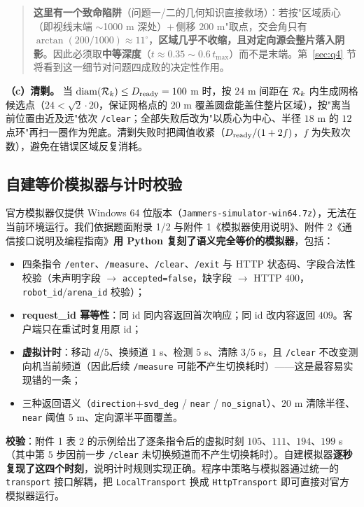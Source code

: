 \begin{quote}
\textbf{这里有一个致命陷阱}（问题一/二的几何知识直接救场）：若按"区域质心（即视线末端 $\sim$1000 m 深处）$+\,$侧移 $200$ m"取点，交会角只有 $\arctan(200/1000)\approx11^\circ$，\textbf{区域几乎不收缩，且对定向源会整片落入阴影}。因此必须取\textbf{中等深度}（$t\approx0.35\!\sim\!0.6\,t_{\max}$）而不是末端。第~\ref{sec:q4} 节将看到这一细节对问题四成败的决定性作用。
\end{quote}

\noindent\textbf{（c）清剿。} 当 $\operatorname{diam}(\mathcal{R}_k)\le D_{\rm ready}=100$ m 时，按 $24$ m 间距在 $\mathcal{R}_k$ 内生成网格候选点（$24<\sqrt2\cdot20$，保证网格点的 $20$ m 覆盖圆盘能盖住整片区域），按"离当前位置由近及远"依次 \texttt{/clear}；全部失败后改为"以质心为中心、半径 $18$ m 的 $12$ 点环"再扫一圈作为兜底。清剿失败时把阈值收紧（$D_{\rm ready}/(1+2f)$，$f$ 为失败次数），避免在错误区域反复消耗。

\subsection{自建等价模拟器与计时校验}

官方模拟器仅提供 Windows 64 位版本（\texttt{Jammers-simulator-win64.7z}），无法在当前环境运行。我们依据题面附录 1/2 与附件 1《模拟器使用说明》、附件 2《通信接口说明及编程指南》\textbf{用 Python 复刻了语义完全等价的模拟器}，包括：

\begin{itemize}
  \item 四条指令 \texttt{/enter}、\texttt{/measure}、\texttt{/clear}、\texttt{/exit} 与 HTTP 状态码、字段合法性校验（未声明字段 $\to$ \texttt{accepted=false}，缺字段 $\to$ HTTP $400$，\texttt{robot\_id}/\texttt{arena\_id} 校验）；
  \item \textbf{request\_id 幂等性}：同 id 同内容返回首次响应；同 id 改内容返回 $409$。客户端只在重试时复用原 id；
  \item \textbf{虚拟计时}：移动 $d/5$、换频道 $1$ s、检测 $5$ s、清除 $3/5$ s，且 \texttt{/clear} 不改变测向机当前频道（因此后续 \texttt{/measure} 可能\textbf{不}产生切换耗时）——这是最容易实现错的一条；
  \item 三种返回语义（\texttt{direction}$+$\texttt{svd\_deg} / \texttt{near} / \texttt{no\_signal}）、$20$ m 清除半径、\texttt{near} 阈值 $5$ m、定向源半平面覆盖。
\end{itemize}

\noindent\textbf{校验}：附件 1 表 2 的示例给出了逐条指令后的虚拟时刻 $105$、$111$、$194$、$199$ s（其中第 $5$ 步因前一步 \texttt{/clear} 未切换频道而不产生切换耗时）。自建模拟器\textbf{逐秒复现了这四个时刻}，说明计时规则实现正确。程序中策略与模拟器通过统一的 \texttt{transport} 接口解耦，把 \texttt{LocalTransport} 换成 \texttt{HttpTransport} 即可直接对官方模拟器运行。

